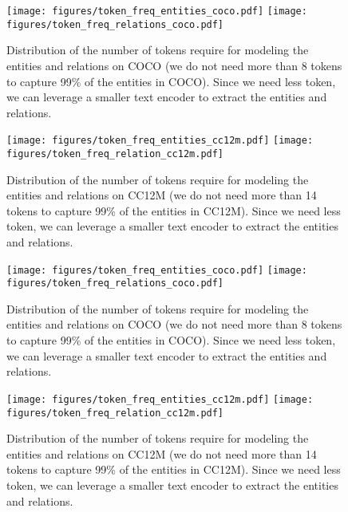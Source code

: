 \ifarxiv
\begin{figure}
        \centering
        \texttt{[image: figures/token\_freq\_entities\_coco.pdf]}
        \texttt{[image: figures/token\_freq\_relations\_coco.pdf]}
     \caption{Distribution of the number of tokens require for modeling the entities and relations on COCO (we do not need more than 8 tokens to capture 99\% of the entities in COCO). Since we need less token, we can leverage a smaller text encoder to extract the entities and relations.}
      \label{fig:coco_token_dist}
    \end{figure}

    \begin{figure}
        \centering
        \texttt{[image: figures/token\_freq\_entities\_cc12m.pdf]}
        \texttt{[image: figures/token\_freq\_relation\_cc12m.pdf]}
     \caption{Distribution of the number of tokens require for modeling the entities and relations on CC12M (we do not need more than 14 tokens to capture 99\% of the entities in CC12M). Since we need less token, we can leverage a smaller text encoder to extract the entities and relations.}
      \label{fig:cc12m_token_dist}
    \end{figure}
    
\else
    \begin{figure}
        \centering
        \texttt{[image: figures/token\_freq\_entities\_coco.pdf]}
        \texttt{[image: figures/token\_freq\_relations\_coco.pdf]}
     \caption{Distribution of the number of tokens require for modeling the entities and relations on COCO (we do not need more than 8 tokens to capture 99\% of the entities in COCO). Since we need less token, we can leverage a smaller text encoder to extract the entities and relations.}
      \label{fig:coco_token_dist}
    \end{figure}

    \begin{figure}
        \centering
        \texttt{[image: figures/token\_freq\_entities\_cc12m.pdf]}
        \texttt{[image: figures/token\_freq\_relation\_cc12m.pdf]}
     \caption{Distribution of the number of tokens require for modeling the entities and relations on CC12M (we do not need more than 14 tokens to capture 99\% of the entities in CC12M). Since we need less token, we can leverage a smaller text encoder to extract the entities and relations.}
      \label{fig:cc12m_token_dist}
    \end{figure}
\fi



